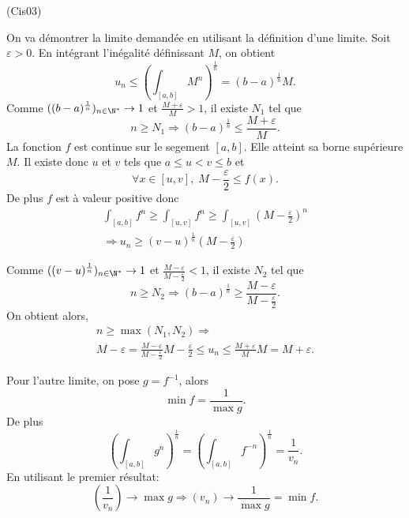 \begin{tiny}(Cis03)\end{tiny}
On va démontrer la limite demandée en utilisant la définition d'une limite.\newline
Soit $\varepsilon > 0$.\newline
En intégrant l'inégalité définissant $M$, on obtient
\[
 u_n \leq \left( \int_{\left[ a,b\right] } M^n\right)^{\frac{1}{n}}
 = (b-a)^{\frac{1}{n}}M.
\]
Comme $((b-a)^{\frac{1}{n}})_{n \in \N^*}\rightarrow 1$ et $\frac{M + \varepsilon}{M} > 1$, il existe $N_1$ tel que
\[
 n \geq N_1 \Rightarrow (b-a)^{\frac{1}{n}} \leq \frac{M + \varepsilon}{M}.
\]
La fonction $f$ est continue sur le segement $\left[ a,b \right]$. Elle atteint sa borne supérieure $M$. Il existe donc $u$ et $v$ tels que
$a\leq u < v \leq b$ et
\[
 \forall x \in \left[ u,v \right], \; M - \frac{\varepsilon}{2} \leq f(x). 
\]
De plus $f$ est à valeur positive donc 
\begin{multline*}
 \int_{\left[ a,b\right] }f^n \geq \int_{\left[ u,v\right] }f^n
 \geq \int_{\left[ u,v\right] }(M-\frac{\varepsilon}{2})^n \\
 \Rightarrow u_n \geq (v-u)^{\frac{1}{n}}(M-\frac{\varepsilon}{2})
\end{multline*}

Comme $((v-u)^{\frac{1}{n}})_{n \in \N^*}\rightarrow 1$ et $\frac{M - \varepsilon}{M-\frac{\varepsilon}{2}} < 1$, il existe $N_2$ tel que
\[
 n \geq N_2 \Rightarrow (b-a)^{\frac{1}{n}} \geq \frac{M - \varepsilon}{M-\frac{\varepsilon}{2}}.
\]
On obtient alors,
\begin{multline*}
 n \geq \max(N_1,N_2) 
 \Rightarrow \\
 M - \varepsilon = \frac{M - \varepsilon}{M-\frac{\varepsilon}{2}} M-\frac{\varepsilon}{2}
 \leq u_n \leq 
 \frac{M + \varepsilon}{M} M = M + \varepsilon.
\end{multline*}

Pour l'autre limite, on pose $g = f^{-1}$, alors
\[
 \min f = \frac{1}{\max g}.
\]
De plus
\[
 \left( \int_{\left[ a,b\right] }g^n\right)^{\frac{1}{n}} 
 = \left( \int_{\left[ a,b\right] }f^{-n}\right)^{\frac{1}{n}}
 = \frac{1}{v_n}.
\]
En utilisant le premier résultat:
\[
 (\frac{1}{v_n})\rightarrow \max g \Rightarrow (v_n)\rightarrow \frac{1}{\max g} = \min f.
\]


